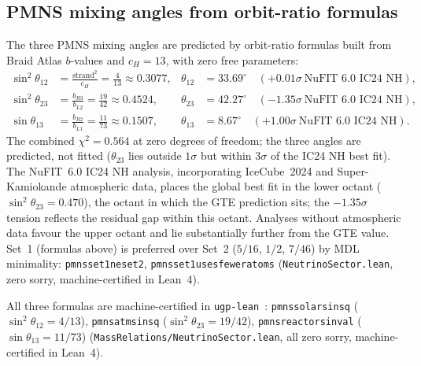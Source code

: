 \documentclass[12pt,a4paper]{article}
\theoremstyle{definition}
\theoremstyle{remark}
\newcommand{\lean}[1]{%
  \penalty-100
  \begingroup\def\_{\textunderscore\allowbreak}\texttt{#1}\endgroup}
\begin{document}
\subsection{PMNS mixing angles from orbit-ratio formulas}
\label{subsec:pmns_angles}

The three PMNS mixing angles are predicted by orbit-ratio formulas built from
Braid Atlas $b$-values and $c_H = 13$, with zero free parameters:
\begin{align}
  \sin^2\!\theta_{12} &= \frac{\mathrm{strand}^2}{c_H} = \frac{4}{13} \approx 0.3077,
    &\theta_{12} &= 33.69^\circ \quad (+0.01\sigma\ \text{NuFIT~6.0 IC24 NH}), \label{eq:th12}\\
  \sin^2\!\theta_{23} &= \frac{b_{R3}}{b_{L2}} = \frac{19}{42} \approx 0.4524,
    &\theta_{23} &= 42.27^\circ \quad (-1.35\sigma\ \text{NuFIT~6.0 IC24 NH}), \label{eq:th23}\\
  \sin\!\theta_{13}   &= \frac{b_{R2}}{b_{L1}} = \frac{11}{73} \approx 0.1507,
    &\theta_{13} &= 8.67^\circ  \quad (+1.00\sigma\ \text{NuFIT~6.0 IC24 NH}). \label{eq:th13}
\end{align}
The combined $\chi^2 = 0.564$ at zero degrees of freedom; the three angles are predicted,
not fitted ($\theta_{23}$ lies outside $1\sigma$ but within $3\sigma$ of the IC24 NH best fit).
The NuFIT~6.0 IC24 NH analysis, incorporating IceCube~2024 and Super-Kamiokande atmospheric
data, places the global best fit in the lower octant ($\sin^2\!\theta_{23} = 0.470$), the
octant in which the GTE prediction sits; the $-1.35\sigma$ tension reflects the residual gap
within this octant. Analyses without atmospheric data favour the upper octant and lie
substantially further from the GTE value.
Set~1 (formulas above) is preferred over Set~2 ($5/16$, $1/2$, $7/46$)
by MDL minimality: \lean{pmns\_set1\_ne\_set2}, \lean{pmns\_set1\_uses\_fewer\_atoms}
(\texttt{NeutrinoSector.lean}, zero sorry, machine-certified in Lean~4).

All three formulas are machine-certified in \lean{ugp-lean}~\cite{ugp-lean}:
\lean{pmns\_solar\_sin\_sq} ($\sin^2\!\theta_{12} = 4/13$),
\lean{pmns\_atm\_sin\_sq} ($\sin^2\!\theta_{23} = 19/42$),
\lean{pmns\_reactor\_sin\_val} ($\sin\theta_{13} = 11/73$)
(\texttt{MassRelations/NeutrinoSector.lean}, all zero sorry, machine-certified in Lean~4).
\end{document}
